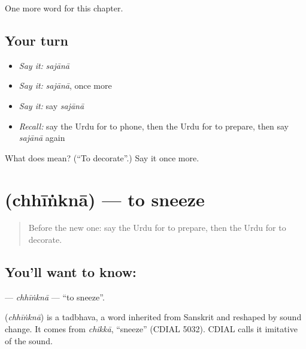 \begin{grammarlens}[title={What you've built}]
One more word for this chapter.
\end{grammarlens}

\subsection*{Your turn}
\begin{itemize}
\raggedright
  \item \emph{Say it:} \emph{sajānā}
  \item \emph{Say it:} \emph{sajānā}, once more
  \item \emph{Say it:} say \emph{sajānā}
  \item \emph{Recall:} say the Urdu for to phone, then the Urdu for to prepare, then say \emph{sajānā} again
\end{itemize}

\begin{tcolorbox}[breakable,colback=teal!4,colframe=teal!35!black,title={Before you move on}]
What does  mean? (\textquotedblleft{}To decorate\textquotedblright{}.) Say it once more.
\end{tcolorbox}
\section[\texorpdfstring{\ur{چھینکنا} (chhīṅknā)}{چھینکنا (chhīṅknā)}]{ (chhīṅknā) — to sneeze}

\label{lesson:UR-C151-chhinkna}



\begin{quote}
Before the new one: say the Urdu for to prepare, then the Urdu for to decorate.
\end{quote}

\subsection*{You'll want to know: }
\textbf{} — \emph{chhīṅknā} — \textquotedblleft{}to sneeze\textquotedblright{}.

\begin{cousinweb}
\textbf{} (\emph{chhīṅknā}) is a tadbhava, a word inherited from Sanskrit and reshaped by sound change. It comes from \emph{chikkā}, \textquotedblleft{}sneeze\textquotedblright{} (CDIAL 5032). CDIAL calls it imitative of the sound.
\end{cousinweb}

